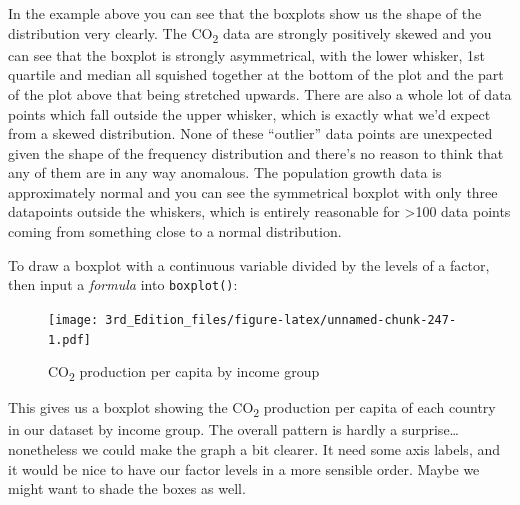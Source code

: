 \documentclass[
]{book}
\newenvironment{Shaded}{\begin{snugshade}}{\end{snugshade}}
\newcommand{\KeywordTok}[1]{\textcolor[rgb]{0.13,0.29,0.53}{\textbf{#1}}}
\newcommand{\NormalTok}[1]{#1}
\newcommand{\OperatorTok}[1]{\textcolor[rgb]{0.81,0.36,0.00}{\textbf{#1}}}
\newcommand{\StringTok}[1]{\textcolor[rgb]{0.31,0.60,0.02}{#1}}
\begin{document}
In the example above you can see that the boxplots show us the shape of the distribution very clearly. The CO\textsubscript{2} data are strongly positively skewed and you can see that the boxplot is strongly asymmetrical, with the lower whisker, 1st quartile and median all squished together at the bottom of the plot and the part of the plot above that being stretched upwards. There are also a whole lot of data points which fall outside the upper whisker, which is exactly what we'd expect from a skewed distribution. None of these ``outlier'' data points are unexpected given the shape of the frequency distribution and there's no reason to think that any of them are in any way anomalous. The population growth data is approximately normal and you can see the symmetrical boxplot with only three datapoints outside the whiskers, which is entirely reasonable for \textgreater100 data points coming from something close to a normal distribution.

To draw a boxplot with a continuous variable divided by the levels of a factor, then input a \emph{formula} into \texttt{boxplot()}:

\begin{Shaded}
\end{Shaded}

\begin{figure}
\centering
\texttt{[image: 3rd\_Edition\_files/figure-latex/unnamed-chunk-247-1.pdf]}
\caption{\label{fig:unnamed-chunk-247}CO\textsubscript{2} production per capita by income group}
\end{figure}

This gives us a boxplot showing the CO\textsubscript{2} production per capita of each country in our dataset by income group. The overall pattern is hardly a surprise\ldots{} nonetheless we could make the graph a bit clearer. It need some axis labels, and it would be nice to have our factor levels in a more sensible order. Maybe we might want to shade the boxes as well.
\end{document}
